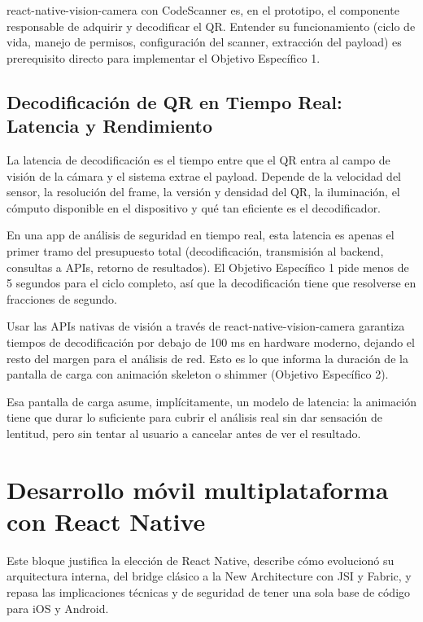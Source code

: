 react-native-vision-camera con CodeScanner es, en el prototipo, el componente responsable de adquirir y decodificar el QR. Entender su funcionamiento (ciclo de vida, manejo de permisos, configuraci\'on del scanner, extracci\'on del payload) es prerequisito directo para implementar el Objetivo Espec\'ifico 1.

\subsection{Decodificaci\'on de QR en Tiempo Real: Latencia y Rendimiento}

La latencia de decodificaci\'on es el tiempo entre que el QR entra al campo de visi\'on de la c\'amara y el sistema extrae el payload. Depende de la velocidad del sensor, la resoluci\'on del frame, la versi\'on y densidad del QR, la iluminaci\'on, el c\'omputo disponible en el dispositivo y qu\'e tan eficiente es el decodificador.

En una app de an\'alisis de seguridad en tiempo real, esta latencia es apenas el primer tramo del presupuesto total (decodificaci\'on, transmisi\'on al backend, consultas a APIs, retorno de resultados). El Objetivo Espec\'ifico 1 pide menos de 5 segundos para el ciclo completo, as\'i que la decodificaci\'on tiene que resolverse en fracciones de segundo.

Usar las APIs nativas de visi\'on a trav\'es de react-native-vision-camera garantiza tiempos de decodificaci\'on por debajo de 100 ms en hardware moderno, dejando el resto del margen para el an\'alisis de red. Esto es lo que informa la duraci\'on de la pantalla de carga con animaci\'on skeleton o shimmer (Objetivo Espec\'ifico 2).

Esa pantalla de carga asume, impl\'icitamente, un modelo de latencia: la animaci\'on tiene que durar lo suficiente para cubrir el an\'alisis real sin dar sensaci\'on de lentitud, pero sin tentar al usuario a cancelar antes de ver el resultado.

\section{Desarrollo m\'ovil multiplataforma con React Native}

Este bloque justifica la elecci\'on de React Native, describe c\'omo evolucion\'o su arquitectura interna, del bridge cl\'asico a la New Architecture con JSI y Fabric, y repasa las implicaciones t\'ecnicas y de seguridad de tener una sola base de c\'odigo para iOS y Android.

